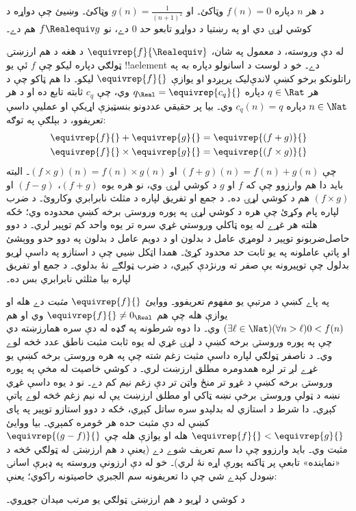 \documentclass[../../../include/open-logic-section]{subfiles}
\begin{document}
\begin{prob}
د هر $n$ دپاره $f(n) = 0$ وټاکئ۔ او $g(n) = \frac{1}{(n+1)^2}$
وټاکئ۔ وښيئ چې دواړه د کوشي لړۍ دي او په رښتيا د دواړو تابعو حد
$0$ دے، نو $f \Realequiv g$ هم دے۔
\end{prob}

له دې وروسته، د معمول په شان، $\equivrep{f}{\Realequiv}$ د هغه د
هم ارزښتۍ ټولګي دپاره ليکو چې $f$ ئې يو !!a{element} دے۔ خو د لوست
د اسانولو دپاره به په راتلونکو برخو کښې لاندې‌ليک پرېږدو او يوازې
$\equivrep{f}{}$ ليکو۔ دا هم ټاکو چې د هر $q \in \Rat$ دپاره
$q_{\Real} = \equivrep{c_{q}}{}$ وي، چې $c_{q}$ ثابته تابع ده او
د هر $n \in \Nat$ دپاره $c_q(n) = q$ وي۔ بيا پر حقيقي عددونو
بنسټيزې اړيکې او عمليې داسې تعريفوو، د بېلګې په توګه:
\begin{align*}
	\equivrep{f}{} + \equivrep{g}{} &= 	\equivrep{(f + g)}{} \\
	\equivrep{f}{} \times 	\equivrep{g}{} &= \equivrep{(f \times g)}{}
\end{align*}
چې $(f + g)(n) = f(n) + g(n)$ او $(f \times g)(n) = f(n) \times
g(n)$۔ البته بايد دا هم وارزوو چې که $f$ او $g$ د کوشي لړۍ وي، نو
هره يوه $(f + g)$، $(f-g)$ او $(f\times g)$ هم د کوشي لړۍ ده۔
د جمع او تفريق لپاره د مثلث نابرابري وکاروئ۔ د ضرب لپاره پام
وکړئ چې هره د کوشي لړۍ په پوره وروستۍ برخه کښې محدوده وي؛ ځکه
هلته هر غړے له يوه ټاکلي وروستي غړي سره تر يوه واحد کم توپير لري۔
د دوو حاصل‌ضربونو توپير د لومړي عامل د بدلون او د دويم عامل د
بدلون په دوو حدو ووېشئ او پاتې عاملونه په يو ثابت حد محدود کړئ۔
همدا اټکل ښيي چې د استازو په داسې لړيو بدلول چې توپيرونه يې صفر
ته ورنژدې کېږي، د ضرب ټولګے نۀ بدلوي۔ د جمع او تفريق لپاره بيا
مثلثي نابرابري بس ده۔

په پاے کښې د مرتبې يو مفهوم تعريفوو۔ ووايئ $\equivrep{f}{}$
\emph{مثبت} دے هله او يوازې هله چې هم $\equivrep{f}{}\neq 0_\Real$
وي او هم $(\exists \ell \in \Nat)(\forall n > \ell)0 < f(n)$ وي۔
دا دوه شرطونه په ګډه له دې سره همارزښته دي چې په پوره
وروستۍ برخه کښې د لړۍ غړي له يوه ثابت مثبت ناطق عدد څخه لوے وي۔
د ناصفر ټولګي لپاره داسې مثبت زغم شته چې په هره وروستۍ برخه کښې
يو غړے لږ تر لږه همدومره مطلق ارزښت لري۔ د کوشي خاصيت له مخې په
پوره وروستۍ برخه کښې د غړو تر منځ واټن تر دې زغم نيم کم دے۔
نو د يوه داسې غړي نښه د ټولې وروستۍ برخې نښه ټاکي او مطلق
ارزښت يې له نيم زغم څخه لوے پاتې کېږي۔ دا شرط د استازي له بدلېدو
سره ساتل کېږي، ځکه د دوو استازو توپير په پاى کښې له دې مثبت
حده هر څومره کمېږي۔ بيا ووايئ
$\equivrep{f}{} < \equivrep{g}{}$ هله او يوازې هله چې
$\equivrep{(g - f)}{}$ مثبت وي۔ بايد وارزوو چې دا سم تعريف شوے
دے (يعنې د هم ارزښتۍ له ټولګي څخه د «نماينده» تابعې پر ټاکنه پورې
اړه نۀ لري)۔
خو له دې ارزونې وروسته په ډېرې اسانۍ ښودل کېدے شي چې دا تعريفونه
سم الجبري خاصيتونه راکوي؛ يعنې:
\begin{thm}
د کوشي د لړيو د هم ارزښتۍ ټولګي يو مرتب ميدان جوړوي۔
\end{thm}
\end{document}
